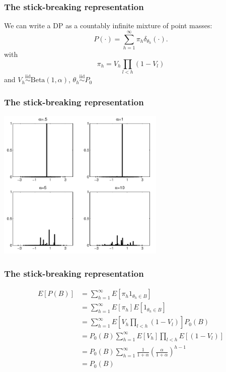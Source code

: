 \documentclass{beamer}
\begin{document}
\begin{frame}
\frametitle{The stick-breaking representation}

We can write a DP as a countably infinite mixture of point masses:
$$
P(\cdot) = \sum_{h=1}^{\infty} \pi_h \delta_{\theta_h}(\cdot).
$$
with
$$
\pi_h = V_h \prod_{l < h}(1-V_l)
$$
and $V_h \overset{\text{iid}}{\sim} \text{Beta}(1,\alpha)$, $\theta_h \overset{\text{iid}}{\sim} P_0$

\end{frame}
\begin{frame}
\frametitle{The stick-breaking representation}

\begin{center}
\includegraphics[width=80mm]{stick_breaking.png}
\end{center}


\end{frame}


\begin{frame}
\frametitle{The stick-breaking representation}


\begin{align*}
E[P(B)] &= \sum_{h=1}^{\infty} E[\pi_h 1_{\theta_h \in B}]\\
&= \sum_{h=1}^{\infty} E[\pi_h] E[1_{\theta_h \in B}] \\
&= \sum_{h=1}^{\infty} E[V_h \prod_{l < h}(1-V_l)] P_0(B) \\
&= P_0(B) \sum_{h=1}^{\infty} E[V_h] \prod_{l < h}E[(1-V_l)] \\
&= P_0(B) \sum_{h=1}^{\infty} \frac{1}{1+\alpha}\left(\frac{\alpha}{1+\alpha}  \right)^{h-1}\\
&= P_0(B) 
\end{align*}

\end{frame}
\end{document}
